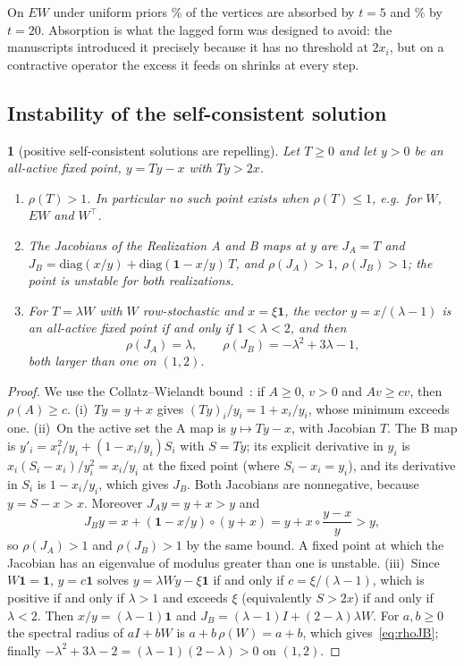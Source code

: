 \documentclass[11pt,a4paper]{article}
\theoremstyle{definition}
\theoremstyle{plain}
\newcommand{\genpropname}{}
\newtheorem*{genprop}{\genpropname}
\newenvironment{prop}[1]{\renewcommand{\genpropname}{Proposition #1}\begin{genprop}}{\end{genprop}}
\newcommand{\diag}{\mathrm{diag}}
\newcommand{\one}{\mathbf{1}}
\begin{document}
On $EW$ under uniform priors \TrivBFiveUnif\% of the vertices are absorbed by $t=5$ and \TrivBTwentyUnif\% by $t=20$. Absorption is what the lagged form was designed to avoid: the manuscripts introduced it precisely because it has no threshold at $2x_i$, but on a contractive operator the excess it feeds on shrinks at every step.

\subsection{Instability of the self-consistent solution}

\begin{prop}{C}[positive self-consistent solutions are repelling]
Let $T\ge0$ and let $y>0$ be an all-active fixed point, $y=Ty-x$ with $Ty>2x$.
\begin{enumerate}[label=(\roman*),leftmargin=2em]
\item $\rho(T)>1$. In particular no such point exists when $\rho(T)\le1$, e.g.\ for $W$, $EW$ and $W^{\top}$.
\item The Jacobians of the Realization A and B maps at $y$ are $J_A=T$ and $J_B=\diag(x/y)+\diag(\one-x/y)\,T$, and $\rho(J_A)>1$, $\rho(J_B)>1$; the point is unstable for both realizations.
\item For $T=\lambda W$ with $W$ row-stochastic and $x=\xi\one$, the vector $y=x/(\lambda-1)$ is an all-active fixed point if and only if $1<\lambda<2$, and then
\begin{equation}\label{eq:rhoJB}
\rho(J_A)=\lambda,\qquad \rho(J_B)=-\lambda^2+3\lambda-1,
\end{equation}
both larger than one on $(1,2)$.
\end{enumerate}
\end{prop}

\begin{proof}
We use the Collatz--Wielandt bound~\cite[Thm.~8.1.26]{hornjohnson13}: if $A\ge0$, $v>0$ and $Av\ge cv$, then $\rho(A)\ge c$. (i)~$Ty=y+x$ gives $(Ty)_i/y_i=1+x_i/y_i$, whose minimum exceeds one. (ii)~On the active set the A map is $y\mapsto Ty-x$, with Jacobian $T$. The B map is $y'_i=x_i^2/y_i+(1-x_i/y_i)S_i$ with $S=Ty$; its explicit derivative in $y_i$ is $x_i(S_i-x_i)/y_i^2=x_i/y_i$ at the fixed point (where $S_i-x_i=y_i$), and its derivative in $S_i$ is $1-x_i/y_i$, which gives $J_B$. Both Jacobians are nonnegative, because $y=S-x>x$. Moreover $J_Ay=y+x>y$ and
\[
J_By=x+(\one-x/y)\circ(y+x)=y+x\circ\frac{y-x}{y}>y,
\]
so $\rho(J_A)>1$ and $\rho(J_B)>1$ by the same bound. A fixed point at which the Jacobian has an eigenvalue of modulus greater than one is unstable. (iii)~Since $W\one=\one$, $y=c\one$ solves $y=\lambda Wy-\xi\one$ if and only if $c=\xi/(\lambda-1)$, which is positive if and only if $\lambda>1$ and exceeds $\xi$ (equivalently $S>2x$) if and only if $\lambda<2$. Then $x/y=(\lambda-1)\one$ and $J_B=(\lambda-1)I+(2-\lambda)\lambda W$. For $a,b\ge0$ the spectral radius of $aI+bW$ is $a+b\,\rho(W)=a+b$, which gives~\eqref{eq:rhoJB}; finally $-\lambda^2+3\lambda-2=(\lambda-1)(2-\lambda)>0$ on $(1,2)$.
\end{proof}
\end{document}
